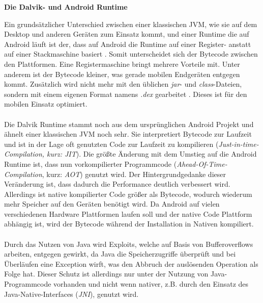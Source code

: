 \begin{flushleft}
	\textbf{Die Dalvik- und Android Runtime}\\
\end{flushleft}
	Ein grundsätzlicher Unterschied zwischen einer klassischen JVM, wie sie auf dem Desktop und anderen Geräten zum Einsatz kommt, und einer Runtime die auf Android läuft ist der, dass auf Android die Runtime auf einer Register- anstatt auf einer Stackmaschine basiert \cite{DalvikBytecode}. Somit unterscheidet sich der Bytecode zwischen den Plattformen. Eine Registermaschine bringt mehrere Vorteile mit. Unter anderem ist der Bytecode kleiner, was gerade mobilen Endgeräten entgegen kommt.
	Zusätzlich wird nicht mehr mit den üblichen \textit{jar}- und \textit{class}-Dateien, sondern mit einem eigenen Format namens \textit{.dex} gearbeitet \cite{DexFormat}. Dieses ist für den mobilen Einsatz optimiert.\\\\
	Die Dalvik Runtime stammt noch aus dem ursprünglichen Android Projekt und ähnelt einer klassischen JVM noch sehr. Sie interpretiert Bytecode zur Laufzeit und ist in der Lage oft genutzten Code zur Laufzeit zu kompilieren (\textit{Just-in-time-Compilation, kurz: JIT}).
	Die größte Änderung mit dem Umstieg auf die Android Runtime ist, dass nun vorkompilierter Programmcode (\textit{Ahead-Of-Time-Compilation}, kurz: \textit{AOT}) genutzt wird. Der Hintergrundgedanke dieser Veränderung ist, dass dadurch die Performance deutlich verbessert wird. Allerdings ist native kompilierter Code größer als Bytecode, wodurch wiederum mehr Speicher auf den Geräten benötigt wird. Da Android auf vielen verschiedenen Hardware Plattformen laufen soll und der native Code Plattform abhängig ist, wird der Bytecode während der Installation in Nativen kompiliert.\\\\
	Durch das Nutzen von Java wird Exploits, welche auf Basis von Bufferoverflows arbeiten, entgegen gewirkt, da Java die Speicherzugriffe überprüft und bei Überläufen eine Exception wirft, was den Abbruch der auslösenden Operation als Folge hat. Dieser Schutz ist allerdings nur unter der Nutzung von Java-Programmcode vorhanden und nicht wenn nativer, z.B. durch den Einsatz des Java-Native-Interfaces (\textit{JNI}), genutzt wird.